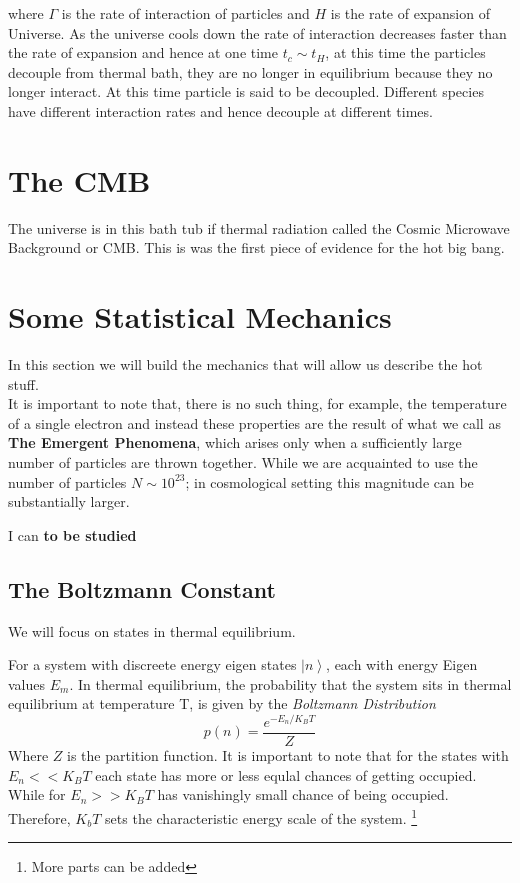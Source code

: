 \documentclass[12pt]{report}
\newcommand{\tbf}[1]{\textbf{#1}}
\newcommand{\tit}[1]{\textit{#1}}
\newcommand{\fn}[1]{\footnote{#1}}
\newcommand{\ket}[1]{\ensuremath{\left|#1\right\rangle}}
\begin{document}
where $\Gamma$ is the rate of interaction of particles and $H$ is the rate of expansion of Universe. As the universe cools down the rate of interaction decreases faster than the rate of expansion and hence at one time $t_c \sim t_H$, at this time the particles decouple from thermal bath, they are no longer in equilibrium because they no longer interact. At this time particle is said to be decoupled. Different species have different interaction rates and hence decouple at different times.

\section{The CMB}
The universe is in this bath tub if thermal radiation called the Cosmic Microwave Background or CMB. This is was the first piece of evidence for the hot big bang.


\section*{Some Statistical Mechanics}
In this section we will build the mechanics that will allow us describe the hot stuff.\\

It is important to note that, there is no such thing, for example, the temperature of a single electron and instead these properties are the result of what we call as \tbf{The Emergent Phenomena}, which arises only when a sufficiently large number of particles are thrown together. While we are acquainted to use the number of particles $N \sim 10^{23}$; in cosmological setting this magnitude can be substantially larger. 

I can \tbf{to be studied}

\subsection{The Boltzmann Constant}
We will focus on states in thermal equilibrium. 

For a system with discreete energy eigen states $\ket{n}$, each with energy Eigen values $E_m$. In thermal equilibrium, the probability that the system sits in thermal equilibrium at temperature T, is given by the \tit{Boltzmann Distribution}
\begin{equation}
p(n)=\frac{e^{-E_n/K_BT}}{Z}
\end{equation}
Where $Z$ is the partition function. It is important to note that for the states  with $E_n<<K_BT$ each state has more or less equlal chances of getting occupied. While for $E_n>>K_BT$ has vanishingly small chance of being occupied. Therefore, $K_bT$ sets the characteristic energy scale of the system. \fn{More parts can be added}
\end{document}
